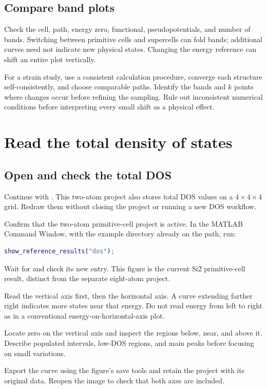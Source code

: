 \subsection{Compare band plots}

Check the cell, path, energy zero, functional, pseudopotentials, and number of bands. Switching between primitive cells and supercells can fold bands; additional curves need not indicate new physical states. Changing the energy reference can shift an entire plot vertically.

For a strain study, use a consistent calculation procedure, converge each structure self-consistently, and choose comparable paths. Identify the bands and $k$ points where changes occur before refining the sampling. Rule out inconsistent numerical conditions before interpreting every small shift as a physical effect.

\section{Read the total density of states}

\subsection{Open and check the total DOS}

Continue with . This two-atom project also stores total DOS values on a $4\times4\times4$ grid. Redraw them without closing the project or running a new DOS workflow.

\begin{steps}
\item Confirm that the two-atom primitive-cell project is active. In the MATLAB\regmark{} Command Window, with the example directory already on the path, run:
\begin{lstlisting}[language=Matlab]
show_reference_results("dos");
\end{lstlisting}
\item Wait for  and check its new  entry. This figure is the current Si2 primitive-cell result, distinct from the separate eight-atom project.
\item Read the vertical  axis first, then the horizontal  axis. A curve extending farther right indicates more states near that energy. Do not read energy from left to right as in a conventional energy-on-horizontal-axis plot.
\item Locate zero on the vertical axis and inspect the regions below, near, and above it. Describe populated intervals, low-DOS regions, and main peaks before focusing on small variations.
\item Export the curve using the figure's save tools and retain the project with its original data. Reopen the image to check that both axes are included.
\end{steps}

